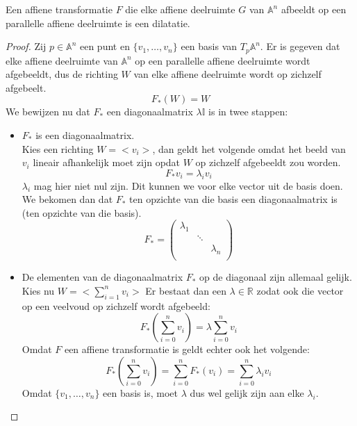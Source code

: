 \documentclass[main.tex]{subfiles}
\begin{document}
\begin{st}
  \label{st:dilatatie-parallelle-deelruimte}
  Een affiene transformatie $F$ die elke affiene deelruimte $G$ van $\mathbb{A}^{n}$ afbeeldt op een parallelle affiene deelruimte is een dilatatie.

  \begin{proof}
    Zij $p\in \mathbb{A}^{n}$ een punt en $\{v_{1},\dotsc, v_{n}\}$ een basis van $T_{p}\mathbb{A}^{n}$.
  Er is gegeven dat elke affiene deelruimte van $\mathbb{A}^{n}$ op een parallelle affiene deelruimte wordt afgebeeldt, dus de richting $W$ van elke affiene deelruimte wordt op zichzelf afgebeelt.
  \[ F_{*}(W) = W \]
  We bewijzen nu dat $F_{*}$ een diagonaalmatrix $\lambda\mathbb{I}$ is in twee stappen:
  \begin{itemize}
  \item $F_{*}$ is een diagonaalmatrix.\\
    Kies een richting $W = <v_{i}>$, dan geldt het volgende omdat het beeld van $v_{i}$ lineair afhankelijk moet zijn opdat $W$ op zichzelf afgebeeldt zou worden.
    \[ F_{*}v_{i} = \lambda_{i} v_{i} \]
    $\lambda_{i}$ mag hier niet nul zijn.
    Dit kunnen we voor elke vector uit de basis doen.
    We bekomen dan dat $F_{*}$ ten opzichte van die basis een diagonaalmatrix is (ten opzichte van die basis).
    \[
    F_{*} = 
    \begin{pmatrix}
      \lambda_{1} &         & \\
                  & \ddots & \\
                  &        & \lambda_{n}\\
    \end{pmatrix}
    \]
  \item De elementen van de diagonaalmatrix $F_{*}$ op de diagonaal zijn allemaal gelijk.\\
    Kies nu $W = <\sum_{i=1}^{n}v_{i} >$
    Er bestaat dan een $\lambda \in \mathbb{R}$ zodat ook die vector op een veelvoud op zichzelf wordt afgebeeld:
    \[ F_{*}\left(\sum_{i=0}^{n}v_{i}\right) = \lambda\sum_{i=0}^{n}v_{i} \]
    Omdat $F$ een affiene transformatie is geldt echter ook het volgende:
    \[ F_{*}\left(\sum_{i=0}^{n}v_{i}\right) = \sum_{i=0}^{n}F_{*}(v_{i}) = \sum_{i=0}^{n}\lambda_{i}v_{i}\]
    Omdat $\{v_{1},\dotsc, v_{n}\}$ een basis is, moet $\lambda$ dus wel gelijk zijn aan elke $\lambda_{i}$.
  \end{itemize}
  \end{proof}
\end{st}
\end{document}
